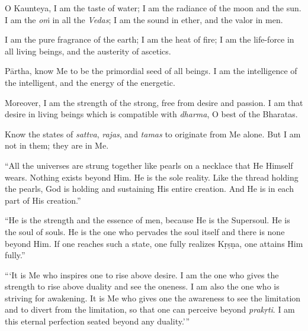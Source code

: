 {O Kaunteya, I am the taste of water; I am the radiance of the moon and the sun. I am the \textit{oṁ} in all the \textit{Vedas}; I am the sound in ether, and the valor in men.}

{I am the pure fragrance of the earth; I am the heat of fire; I am the life-force in all living beings, and the austerity of ascetics.}

{Pārtha, know Me to be the primordial seed of all beings. I am the intelligence of the intelligent, and the energy of the energetic.}

{Moreover, I am the strength of the strong, free from desire and passion. I am that desire in living beings which is compatible with \textit{dharma}, O best of the Bharatas.}

{Know the states of \textit{sattva}, \textit{rajas}, and \textit{tamas} to originate from Me alone. But I am not in them; they are in Me.}

\enquote{All the universes are strung together like pearls on a necklace that He Himself wears. Nothing exists beyond Him. He is the sole reality. Like the thread holding the pearls, God is holding and sustaining His entire creation. And He is in each part of His creation.}

\enquote{He is the strength and the essence of men, because He is the Supersoul. He is the soul of souls. He is the one who pervades the soul itself and there is none beyond Him. If one reaches such a state, one fully realizes Kṛṣṇa, one attains Him fully.}

\enquote{\enquote{It is Me who inspires one to rise above desire. I am the one who gives the strength to rise above duality and see the oneness. I am also the one who is striving for awakening. It is Me who gives one the awareness to see the limitation and to divert from the limitation, so that one can perceive beyond \textit{prakṛti}. I am this eternal perfection seated beyond any duality.}}

